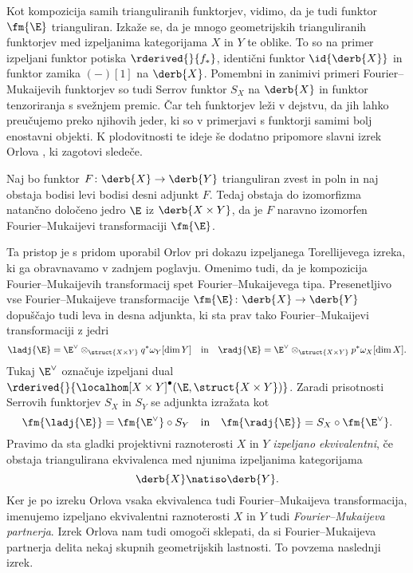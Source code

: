 Kot kompozicija samih trianguliranih funktorjev, vidimo, da je tudi funktor $\fm{\E}$ trianguliran. Izkaže se, da je mnogo geometrijskih trianguliranih funktorjev med izpeljanima kategorijama $X$ in $Y$ te oblike. To so na primer izpeljani funktor potiska $\rderived{}{f_*}$, identični funktor $\id{\derb{X}}$ in funktor zamika $(-)[1]$ na $\derb{X}$. Pomembni in zanimivi primeri Fourier--Mukaijevih funktorjev so tudi Serrov funktor $S_X$ na $\derb{X}$ in funktor tenzoriranja s svežnjem premic. Čar teh funktorjev leži v dejstvu, da jih lahko preučujemo preko njihovih jeder, ki so v primerjavi s funktorji samimi bolj enostavni objekti. K plodovitnosti te ideje še dodatno pripomore slavni izrek Orlova \cite{Orlov2003}, ki zagotovi sledeče.

\begin{izrek}
    Naj bo funktor $F \colon \derb{X} \to \derb{Y}$ trianguliran zvest in poln in naj obstaja bodisi levi bodisi desni adjunkt $F$. Tedaj obstaja do izomorfizma natančno določeno jedro $\E$ iz $\derb{X \times Y}$, da je $F$ naravno izomorfen Fourier--Mukaijevi transformaciji $\fm{\E}$.
\end{izrek}
Ta pristop je s pridom uporabil Orlov \cite{Orlov2003} pri dokazu izpeljanega Torellijevega izreka, ki ga obravnavamo v zadnjem poglavju. Omenimo tudi, da je kompozicija Fourier--Mukaijevih transformacij spet Fourier--Mukai\-je\-vega tipa. Presenetljivo vse Fourier--Mu\-kai\-jeve transformacije $\fm{\E} \colon \derb{X} \to \derb{Y}$ dopuščajo tudi leva in desna adjunkta, ki sta prav tako Fourier--Mukaijevi transformaciji z jedri 
\[
    \ladj{\E} = \E^\vee \otimes_{\struct{X \times Y}} q^*\omega_Y[\dim Y] \quad \text{in} \quad 
    \radj{\E} = \E^\vee \otimes_{\struct{X \times Y}} p^*\omega_X[\dim X].
\]
Tukaj $\E^\vee$ označuje izpeljani dual $\rderived{}{\localhom[X \times Y]^\bullet(\E, \struct{X\times Y})}$. Zaradi prisotnosti Serrovih funktorjev $S_X$ in $S_Y$ se adjunkta izražata kot
\begin{equation*}
    \fm{\ladj{\E}} = \fm{\E^\vee} \circ S_Y \quad \text{in} \quad 
    \fm{\radj{\E}} = S_X \circ \fm{\E^\vee}.
\end{equation*}
Pravimo da sta gladki projektivni raznoterosti $X$ in $Y$ \emph{izpeljano ekvivalentni}, če obstaja triangulirana ekvivalenca med njunima izpeljanima kategorijama
\[
    \derb{X} \natiso \derb{Y}.
\]
Ker je po izreku Orlova vsaka ekvivalenca tudi Fourier--Mukaijeva transformacija, imenujemo izpeljano ekvivalentni raznoterosti $X$ in $Y$ tudi \emph{Fourier--Mukaijeva partnerja}. Izrek Orlova nam tudi omogoči sklepati, da si Fourier--Mukaijeva partnerja delita nekaj skupnih geometrijskih lastnosti. To povzema naslednji izrek.

